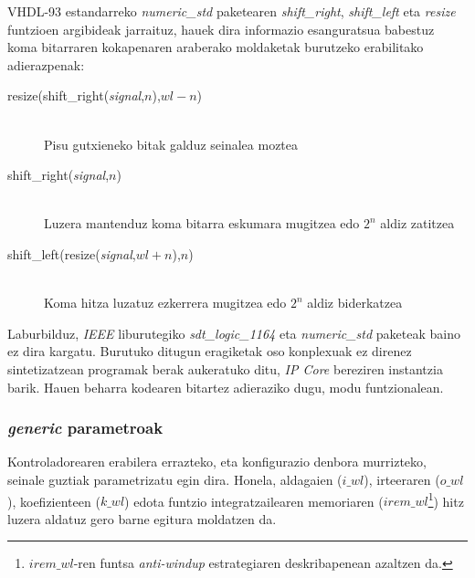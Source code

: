 %


VHDL-93 estandarreko \emph{numeric\_std} paketearen \emph{shift\_right}, \emph{shift\_left} eta \emph{resize} funtzioen argibideak jarraituz, hauek dira informazio esanguratsua babestuz koma bitarraren kokapenaren araberako moldaketak burutzeko erabilitako adierazpenak:

\begin{description}
\item[resize(shift\_right(\emph{signal},$n$),$wl-n$)]{\hfill \\Pisu gutxieneko bitak galduz seinalea moztea}
\item[shift\_right(\emph{signal},$n$)]{\hfill \\Luzera mantenduz koma bitarra eskumara mugitzea edo $2^{n}$ aldiz zatitzea}
\item[shift\_left(resize(\emph{signal},$wl+n$),$n$)]{\hfill \\Koma hitza luzatuz ezkerrera mugitzea edo $2^{n}$ aldiz biderkatzea}
\end{description}

Laburbilduz, \emph{IEEE} liburutegiko \emph{sdt\_logic\_1164} eta \emph{numeric\_std} paketeak baino ez dira kargatu. Burutuko ditugun eragiketak oso konplexuak ez direnez sintetizatzean programak berak aukeratuko ditu, \emph{IP Core} bereziren instantzia barik. Hauen beharra kodearen bitartez adieraziko dugu, modu funtzionalean.






\subsubsection{\emph{generic} parametroak}

Kontroladorearen erabilera errazteko, eta konfigurazio denbora murrizteko, seinale guztiak parametrizatu egin dira. Honela, aldagaien ($i\_wl$), irteeraren ($o\_wl$), koefizienteen ($k\_wl$) edota funtzio integratzailearen memoriaren ($irem\_wl$\footnote{$irem\_wl$-ren funtsa \emph{anti-windup} estrategiaren deskribapenean azaltzen da.}) hitz luzera aldatuz gero barne egitura moldatzen da.


